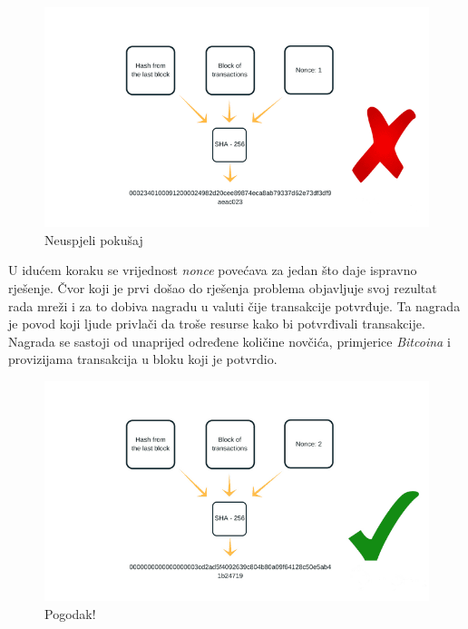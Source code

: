 \documentclass[times, utf8, zavrsni, numeric]{fer}
\begin{document}
\begin{figure}[ht]
  \includegraphics[width=\textwidth]{proof-of-work-wrong-result-2.png}
  \caption{Neuspjeli pokušaj}
  \centering
\end{figure}

U idućem koraku se vrijednost \emph{nonce} povećava za jedan što daje ispravno rješenje. Čvor koji je prvi došao do rješenja problema objavljuje svoj rezultat rada mreži
i za to dobiva nagradu u valuti čije transakcije potvrđuje. Ta nagrada je povod koji ljude privlači da troše resurse kako bi potvrđivali transakcije. Nagrada se sastoji
od unaprijed određene količine novčića, primjerice \emph{Bitcoina} i provizijama transakcija u bloku koji je potvrdio. 

\begin{figure}[ht]
  \includegraphics[width=\textwidth]{proof-of-work-right-result-2.png}
  \caption{Pogodak!}
  \centering
\end{figure}
\end{document}
